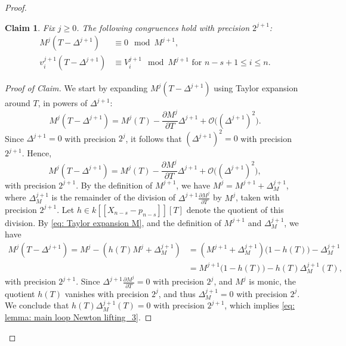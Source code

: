\documentclass[10pt,a4paper]{amsart}
\newtheorem{claim}{Claim}
\begin{document}
\begin{proof}
\begin{claim} Fix $j\geq 0$. The following congruences hold with precision $2^{j+1}$:
 \begin{align}
 M^j(T-\Delta^{j+1})&\equiv 0 \mod M^{j+1},\label{eq: lemma: main loop Newton lifting_3}\\
 v^{j+1}_i(T-\Delta^{j+1})&\equiv V^{j+1}_i \mod M^{j+1} \textrm{ for }n-s+1\le i \le n.
 \label{eq: lemma: main loop Newton lifting_4}
 \end{align}
\end{claim}
%
\begin{proof}[Proof of Claim]
%
We start by expanding $M^j(T-\Delta^{j+1})$ using Taylor expansion
around $T$, in
powers of $\Delta^{j+1}$:
%
$$
M^j(T-\Delta^{j+1})=M^j(T)-\frac{\partial M^j}{\partial T}\Delta^{j+1}
+\mathcal{O}\big((\Delta^{j+1})^2\big).
$$
%
Since $\Delta^{j+1}=0$ with precision $2^{j}$, it follows that
$(\Delta^{j+1})^2=0$ with precision $2^{j+1}$. Hence,
%
\begin{equation}\label{eq: Taylor expansion M}
M^j(T-\Delta^{j+1})=M^j(T)-\frac{\partial M^j}{\partial T}\Delta^{j+1}
+\mathcal{O}\big((\Delta^{j+1})^2\big),
\end{equation}
%
with precision $2^{j+1}$. By the definition of $M^{j+1}$,
we have $M^j=M^{j+1}+\Delta^{j+1}_{M}$, where $\Delta^{j+1}_{M}$ is the
remainder of the division of $\Delta^{j+1}\frac{\partial
M^j}{\partial T}$ by $M^j$, taken with precision $2^{j+1}$. Let
$h\in k[\![X_{n-s}-p_{n-s}]\!][T]$ denote the quotient of this
division. By \eqref{eq: Taylor expansion M}, and the definition
of $M^{j+1}$ and $\Delta^{j+1}_{M}$, we have
%
\begin{align*}
M^j(T-\Delta^{j+1})=
M^j-(h(T)M^j+\Delta^{j+1}_{M})
&=
(M^{j+1}+\Delta^{j+1}_{M})\big(1-h(T)\big)-\Delta^{j+1}_{M}\\
&=M^{j+1}\big(1-h(T)\big)- h(T)\Delta^{j+1}_{M}(T),
\end{align*}
%
with precision $2^{j+1}$. Since $\Delta^{j+1}\frac{\partial
M^j}{\partial T}=0$ with precision $2^{j}$, and $M^j$ is monic,
the quotient $h(T)$ vanishes with precision $2^{j}$, and thus
$\Delta^{j+1}_{M}=0$ with precision $2^{j}$. We conclude that
$h(T)\Delta^{j+1}_{M}(T)=0$ with precision $2^{j+1}$, which implies
\eqref{eq: lemma: main loop Newton lifting_3}.


\end{proof}
\end{proof}
\end{document}
